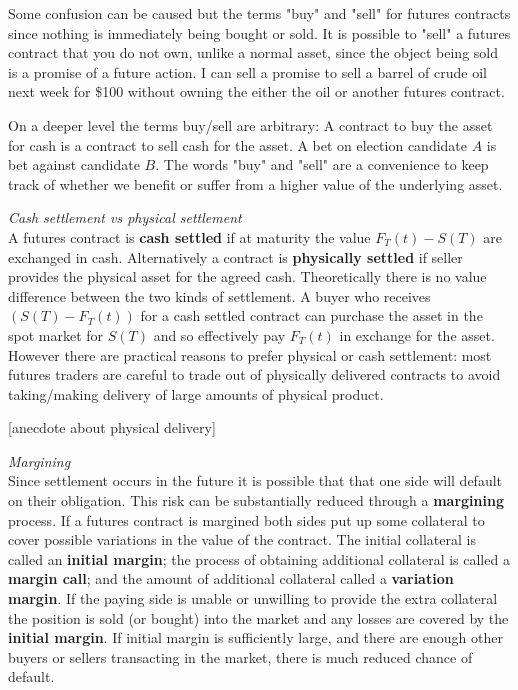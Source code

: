 \documentclass{tran-l}
\theoremstyle{definition}
\theoremstyle{remark}
\numberwithin{equation}{subsection}
\begin{document}
Some confusion can be caused but the terms "buy" and "sell" for futures contracts since nothing is immediately being bought or sold. It is possible to "sell" a futures contract that you do not own, unlike a normal asset, since the object being sold is a promise of a future action. I can sell a promise to sell a barrel of crude oil next week for \$100 without owning the either the oil or another futures contract. 

 On a deeper level the terms buy/sell are arbitrary: A contract to buy the asset for cash is a contract to sell cash for the asset. A bet on election candidate $A$ is bet against candidate $B$. The words "buy" and "sell" are a convenience to  keep track of whether we benefit or suffer from a higher value of the underlying asset.

\medskip

\textit{Cash settlement vs physical settlement}\\

A futures contract is \textbf{cash settled} if at maturity the value $F_T(t)-S(T)$ are exchanged in cash. Alternatively a contract is \textbf{physically settled} if seller provides the physical asset for the agreed cash. Theoretically there is no value difference between the two kinds of settlement. A buyer who receives $(S(T)-F_T(t))$ for a cash settled contract can purchase the asset in the spot market for $S(T)$ and so effectively pay $F_T(t)$ in exchange for the asset. However there are practical reasons to prefer physical or cash settlement: most futures traders are careful to trade out of physically delivered contracts to avoid taking/making delivery of large amounts of physical product.

[anecdote about physical delivery]

\medskip

\textit{Margining}\\

Since settlement occurs in the future it is possible that that one side will default on their obligation.  This risk can be substantially reduced through a \textbf{margining} process. If a futures contract is margined both sides put up some collateral to cover possible variations in the value of the contract. The initial collateral is called an \textbf{initial margin}; the process of obtaining additional collateral is called a \textbf{margin call}; and the amount of additional collateral called a \textbf{variation margin}. If the paying side is unable or unwilling to provide the extra collateral the position is sold (or bought) into the market and any losses are covered by the \textbf{initial margin}. If initial margin is sufficiently large, and there are enough other buyers or sellers transacting in the market, there is much reduced chance of default. 
\end{document}
